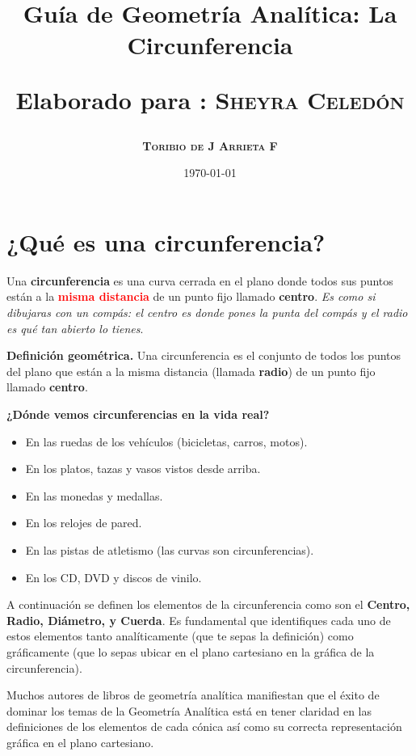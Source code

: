 \documentclass[12pt,a4paper]{article}
\title{\Large Guía de Geometría Analítica: La Circunferencia

\small{Elaborado para : \textsc{\bf{Sheyra Celedón}}}}
\author{\bf{\textsc{Toribio de J Arrieta F}}}
\date{\today}
\begin{document}
	\maketitle

	\section{¿Qué es una circunferencia?}

	Una \textbf{circunferencia} es una curva cerrada en el plano donde todos sus puntos están a la \textcolor{red}{\textbf{misma distancia}} de un punto fijo llamado \textbf{centro}. \emph{Es como si dibujaras con un compás: el centro es donde pones la punta del compás y el radio es qué tan abierto lo tienes}.

	\bigskip

	\textbf{Definición geométrica.} Una circunferencia es el conjunto de todos los puntos del plano que están a la misma distancia (llamada \textbf{radio}) de un punto fijo llamado \textbf{centro}.

	\bigskip

	\textbf{¿Dónde vemos circunferencias en la vida real?}
	\begin{itemize}
		\item En las ruedas de los vehículos (bicicletas, carros, motos).
		\item En los platos, tazas y vasos vistos desde arriba.
		\item En las monedas y medallas.
		\item En los relojes de pared.
		\item En las pistas de atletismo (las curvas son circunferencias).
		\item En los CD, DVD y discos de vinilo.
	\end{itemize}

	\bigskip

	A continuación se definen los elementos de la circunferencia como son el \textbf{Centro, Radio, Diámetro, y Cuerda}. Es fundamental que identifiques cada uno de estos elementos tanto analíticamente (que te sepas la definición) como gráficamente (que lo sepas ubicar en el plano cartesiano en la gráfica de la circunferencia).

	\bigskip

	Muchos autores de libros de geometría analítica manifiestan que el éxito de dominar los temas de la Geometría Analítica está en tener claridad en las definiciones de los elementos de cada cónica así como su correcta representación gráfica en el plano cartesiano.
\end{document}
